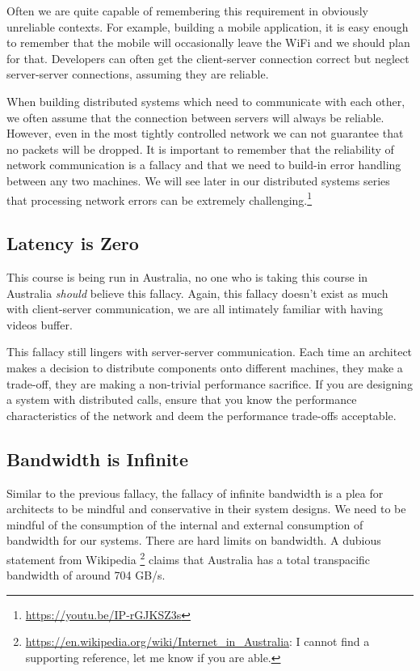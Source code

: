 Often we are quite capable of remembering this requirement in obviously unreliable contexts.
For example, building a mobile application,
it is easy enough to remember that the mobile will occasionally leave the WiFi and we should plan for that.
Developers can often get the client-server connection correct but neglect server-server connections,
assuming they are reliable.

When building distributed systems which need to communicate with each other,
we often assume that the connection between servers will always be reliable.
However, even in the most tightly controlled network we can not guarantee that no packets will be dropped.
It is important to remember that the reliability of network communication is a fallacy and that we need to build-in error handling between any two machines.
We will see later in our distributed systems series that processing network errors can be extremely challenging.\footnote{\url{https://youtu.be/IP-rGJKSZ3s}}

\subsection{Latency is Zero}
This course is being run in Australia,
no one who is taking this course in Australia \textsl{should} believe this fallacy.
Again, this fallacy doesn't exist as much with client-server communication,
we are all intimately familiar with having videos buffer.

This fallacy still lingers with server-server communication.
Each time an architect makes a decision to distribute components onto different machines,
they make a trade-off,
they are making a non-trivial performance sacrifice.
If you are designing a system with distributed calls,
ensure that you know the performance characteristics of the network and deem the performance trade-offs acceptable.

\subsection{Bandwidth is Infinite}
Similar to the previous fallacy,
the fallacy of infinite bandwidth is a plea for architects to be mindful and conservative in their system designs.
We need to be mindful of the consumption of the internal and external consumption of bandwidth for our systems.
There are hard limits on bandwidth.
A dubious statement from Wikipedia%
\footnote{\url{https://en.wikipedia.org/wiki/Internet_in_Australia}: I cannot find a supporting reference, let me know if you are able.} %
claims that Australia has a total transpacific bandwidth of around 704 GB/s.

